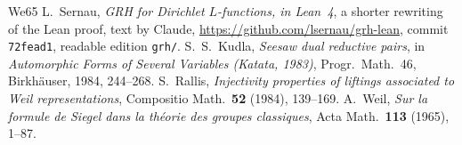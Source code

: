 \documentclass[reqno]{amsart}
\theoremstyle{definition}
\theoremstyle{plain}
\begin{document}
\begin{thebibliography}{We65}
 L.~Sernau, \emph{GRH for Dirichlet \(L\)-functions, in Lean~4}, a shorter rewriting of the Lean proof, text by Claude, \url{https://github.com/lsernau/grh-lean}, commit \texttt{72fead1}, readable edition \texttt{grh/}.
 S.~S.~Kudla, \emph{Seesaw dual reductive pairs}, in \emph{Automorphic Forms of Several Variables (Katata, 1983)}, Progr.\ Math.\ 46, Birkh\"auser, 1984, 244--268.
 S.~Rallis, \emph{Injectivity properties of liftings associated to Weil representations}, Compositio Math.\ \textbf{52} (1984), 139--169.
 A.~Weil, \emph{Sur la formule de Siegel dans la th\'eorie des groupes classiques}, Acta Math.\ \textbf{113} (1965), 1--87.
\end{thebibliography}
\end{document}
